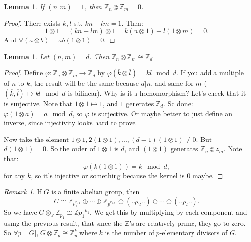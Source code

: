 \documentclass[9pt,reqno,twoside]{amsbook}
\theoremstyle{plain}
\numberwithin{section}{chapter}
\numberwithin{equation}{chapter}
\newtheorem{lem}[theorem]{Lemma}
\theoremstyle{definition}
\theoremstyle{remark}
\newtheorem{rem}[theorem]{Remark}
\theoremstyle{plain}
\newcommand{\z}{\mathbb{Z}}
\newcommand{\bee}{\begin{equation}\begin{aligned}}
\newcommand{\eee}{\end{aligned}\end{equation}}
\newcommand{\tens}{\otimes}
\renewcommand{\bar}{\overline}%
\renewcommand{\phi}{\varphi}
\begin{document}
\begin{lem}
If $(n,m) = 1$, then $\z_n \tens \z_m = 0$. 
\end{lem}

\begin{proof}
There exists $k,l$ s.t. $kn + lm = 1$. Then:
$$
1 \tens 1 = (kn + lm) \tens 1 = k(n \tens 1) + l (1 \tens m) = 0.
$$
And $\forall (a \tens b) = ab(1 \tens 1) = 0$. 
\end{proof}

\begin{lem}
Let $(n,m) = d$. Then $\z_n \tens \z_m \cong \z_d$. 
\end{lem}

\begin{proof}
Define $\phi: \z_n \tens \z_m \to \z_d$ by $\phi(\bar{k}\tens \bar{l}) = kl \mod d$. If you add a multiple of $n$ to $k$, the result will be the same because $d|n$, and same for $m$ ($(\bar{k},\bar{l}) \mapsto kl \mod d$ is bilinear). Why is it a homomorphism? Let's check that it is surjective. Note that $1 \tens 1 \mapsto 1$, and $1$ generates $\z_d$. So done: $\phi(1 \tens a) = a \mod d$, so $\phi$ is surjective. Or maybe better to just define an inverse, since injectivity looks hard to prove. \begin{comment}Any tensor $w \in \z_n \tens \z_m$ is such that: 
\bee
w &= \sum_{i = 1}^n c_i(\bar{k_i} \tens \bar{l_i})\\
&= \sum_{i  =1}^n c_ik_il_i (1 \tens 1)
\eee
And $\phi(w) = \sum{i = 1}^n c_ik_i l_i \mod d$. So $w \in ker\phi$ if and only if $\sum c_ik_il_i \equiv 0 \mod d$.\end{comment} Now take the element $1 \tens 1,2(1\tens 1),...,(d - 1)(1\tens 1) \neq 0$. But $d(1 \tens 1) = 0$. So the order of $1 \tens 1$ is $d$, and $(1 \tens 1)$ generates $\z_n \tens z_m$. Note that:
$$
\phi(k(1\tens 1)) = k \mod d,
$$ 
for any $k$, so it's injective or something because the kernel is 0 maybe. 
\end{proof}

\begin{rem}
If $G$ is a finite abelian group, then 
$$
G \cong \z_{p_1^{r_{1,1}}} \oplus \cdots \oplus \z_{p_1^{r_{1,k_1}}} \oplus ( ..p_2.. ) \oplus \cdots \oplus (..p_l..). 
$$
So we have $G \tens_\z \z_{p_1} \cong \z{p_1}^{k_1}$. We get this by multiplying by each component and using the previous result, that since the $\z$'s are relatively prime, they go to zero. So $\forall p\mid |G|$, $G \tens \z_p \cong \z_p^k$ where $k$ is the number of $p$-elementary divisors of $G$. 
\end{rem}
\end{document}
